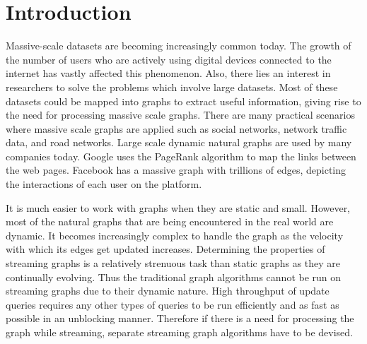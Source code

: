 \section{Introduction}

Massive-scale datasets are becoming increasingly common today. The growth of the number of users who are actively using digital devices connected to the internet has vastly affected this phenomenon. Also, there lies an interest in researchers to solve the problems which involve large datasets. Most of these datasets could be mapped into graphs to extract useful information, giving rise to the need for processing massive scale graphs. There are many practical scenarios where massive scale graphs are applied such as social networks, network traffic data, and road networks. Large scale dynamic natural graphs are used by many companies today. Google uses the PageRank algorithm\cite{brin_anatomy_1998, page_pagerank_nodate} to map the links between the web pages. Facebook has a massive graph with trillions of edges\cite{ching_one_2015}, depicting the interactions of each user on the platform.

It is much easier to work with graphs when they are static and small. However, most of the natural graphs that are being encountered in the real world are dynamic. It becomes increasingly complex to handle the graph as the velocity with which its edges get updated increases. Determining the properties of streaming graphs is a relatively strenuous task than static graphs as they are continually evolving. Thus the traditional graph algorithms cannot be run on streaming graphs due to their dynamic nature. 
High throughput of update queries requires any other types of queries to be run efficiently and as fast as possible in an unblocking manner. Therefore if there is a need for processing the graph while streaming, separate streaming graph algorithms have to be devised\cite{mcgregor_graph_2014}.   

